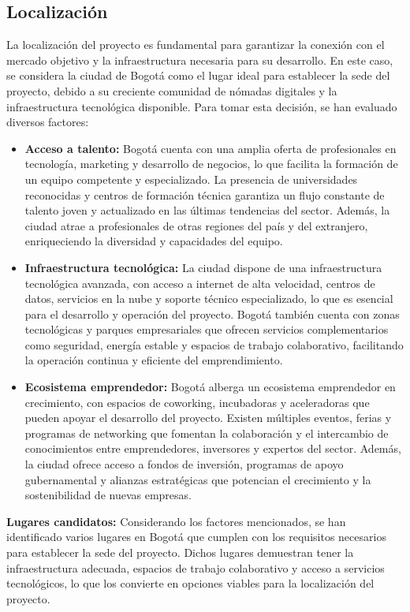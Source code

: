 \subsection*{Localización}
La localización del proyecto es fundamental para garantizar la conexión con el mercado objetivo y la infraestructura necesaria para su desarrollo. En este caso, se considera la ciudad de Bogotá como el lugar ideal para establecer la sede del proyecto, debido a su creciente comunidad de nómadas digitales y la infraestructura tecnológica disponible.
Para tomar esta decisión, se han evaluado diversos factores:
\begin{itemize}
    \item \textbf{Acceso a talento:} Bogotá cuenta con una amplia oferta de profesionales en tecnología, marketing y desarrollo de negocios, lo que facilita la formación de un equipo competente y especializado. La presencia de universidades reconocidas y centros de formación técnica garantiza un flujo constante de talento joven y actualizado en las últimas tendencias del sector. Además, la ciudad atrae a profesionales de otras regiones del país y del extranjero, enriqueciendo la diversidad y capacidades del equipo.

    \item \textbf{Infraestructura tecnológica:} La ciudad dispone de una infraestructura tecnológica avanzada, con acceso a internet de alta velocidad, centros de datos, servicios en la nube y soporte técnico especializado, lo que es esencial para el desarrollo y operación del proyecto. Bogotá también cuenta con zonas tecnológicas y parques empresariales que ofrecen servicios complementarios como seguridad, energía estable y espacios de trabajo colaborativo, facilitando la operación continua y eficiente del emprendimiento.

    \item \textbf{Ecosistema emprendedor:} Bogotá alberga un ecosistema emprendedor en crecimiento, con espacios de coworking, incubadoras y aceleradoras que pueden apoyar el desarrollo del proyecto. Existen múltiples eventos, ferias y programas de networking que fomentan la colaboración y el intercambio de conocimientos entre emprendedores, inversores y expertos del sector. Además, la ciudad ofrece acceso a fondos de inversión, programas de apoyo gubernamental y alianzas estratégicas que potencian el crecimiento y la sostenibilidad de nuevas empresas.
\end{itemize}

\textbf{Lugares candidatos:} Considerando los factores mencionados, se han identificado varios lugares en Bogotá que cumplen con los requisitos necesarios para establecer la sede del proyecto. Dichos lugares demuestran tener la infraestructura adecuada, espacios de trabajo colaborativo y acceso a servicios tecnológicos, lo que los convierte en opciones viables para la localización del proyecto.

